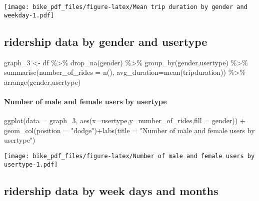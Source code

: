 \documentclass[
]{article}
\newenvironment{Shaded}{\begin{snugshade}}{\end{snugshade}}
\newcommand{\AttributeTok}[1]{\textcolor[rgb]{0.77,0.63,0.00}{#1}}
\newcommand{\FunctionTok}[1]{\textcolor[rgb]{0.00,0.00,0.00}{#1}}
\newcommand{\NormalTok}[1]{#1}
\newcommand{\OtherTok}[1]{\textcolor[rgb]{0.56,0.35,0.01}{#1}}
\newcommand{\SpecialCharTok}[1]{\textcolor[rgb]{0.00,0.00,0.00}{#1}}
\newcommand{\StringTok}[1]{\textcolor[rgb]{0.31,0.60,0.02}{#1}}
\begin{document}
\texttt{[image: bike\_pdf\_files/figure-latex/Mean trip duration by gender and weekday-1.pdf]}

\hypertarget{ridership-data-by-gender-and-usertype}{%
\subsection{ridership data by gender and
usertype}\label{ridership-data-by-gender-and-usertype}}

\begin{Shaded}
\begin{Highlighting}[]
\NormalTok{graph\_3 }\OtherTok{\textless{}{-}}\NormalTok{ df }\SpecialCharTok{\%\textgreater{}\%}
  \FunctionTok{drop\_na}\NormalTok{(gender) }\SpecialCharTok{\%\textgreater{}\%} 
  \FunctionTok{group\_by}\NormalTok{(gender,usertype) }\SpecialCharTok{\%\textgreater{}\%} 
  \FunctionTok{summarise}\NormalTok{(}\AttributeTok{number\_of\_rides =} \FunctionTok{n}\NormalTok{(), }\AttributeTok{avg\_duration=}\FunctionTok{mean}\NormalTok{(tripduration)) }\SpecialCharTok{\%\textgreater{}\%} 
  \FunctionTok{arrange}\NormalTok{(gender,usertype)}
\end{Highlighting}
\end{Shaded}

\hypertarget{number-of-male-and-female-users-by-usertype}{%
\paragraph{Number of male and female users by
usertype}\label{number-of-male-and-female-users-by-usertype}}

\begin{Shaded}
\begin{Highlighting}[]
\FunctionTok{ggplot}\NormalTok{(}\AttributeTok{data =}\NormalTok{ graph\_3, }\FunctionTok{aes}\NormalTok{(}\AttributeTok{x=}\NormalTok{usertype,}\AttributeTok{y=}\NormalTok{number\_of\_rides,}\AttributeTok{fill =}\NormalTok{ gender)) }\SpecialCharTok{+}
  \FunctionTok{geom\_col}\NormalTok{(}\AttributeTok{position =} \StringTok{"dodge"}\NormalTok{)}\SpecialCharTok{+}\FunctionTok{labs}\NormalTok{(}\AttributeTok{title =} \StringTok{"Number of male and female users by usertype"}\NormalTok{)}
\end{Highlighting}
\end{Shaded}

\texttt{[image: bike\_pdf\_files/figure-latex/Number of male and female users by usertype-1.pdf]}

\hypertarget{ridership-data-by-week-days-and-months}{%
\subsection{ridership data by week days and
months}\label{ridership-data-by-week-days-and-months}}
\end{document}
